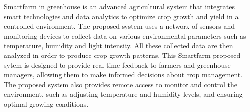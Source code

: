 \begin{abstractEn}
	
	Smartfarm in greenhouse is an advanced agricultural system that integrates
	smart technologies and data analytics to optimize crop growth and yield in a
	controlled environment. The proposed system uses a network of sensors and
	monitoring devices to collect data on various environmental parameters such
	as temperature, humidity and light intensity. All these collected data are then analyzed in order to produce crop growth patterns. 
	This Smartfarm proposed sytem is designed to provide real-time feedback to farmers and
	greenhouse managers, allowing them to make informed decisions about crop
	management. The proposed system also provides remote access to monitor
	and control the environment, such as adjusting temperature and humidity
	levels, and ensuring optimal growing conditions.	
\end{abstractEn}

